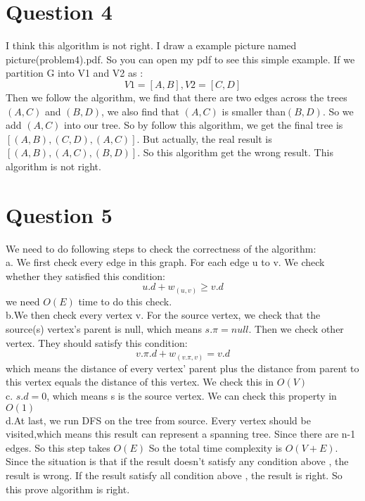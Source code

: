 \documentclass[paper=a4, fontsize=11pt]{scrartcl} %
\numberwithin{equation}{section} %
\numberwithin{figure}{section} %
\numberwithin{table}{section} %
\begin{document}
\vspace{2cm}
\section{\textbf{Question 4}}
I think this algorithm is not right. I draw a example picture named picture(problem4).pdf. So you can open my pdf to see this simple example. If we partition G into V1 and V2 as :
$$ V1=[A,B], V2=[C,D]$$
Then we follow the algorithm, we find that there are two edges across the trees$(A,C)$ and $(B,D)$, we also find that $(A,C)$ is smaller than$(B,D)$. So we add $(A,C)$ into our tree. So by follow this algorithm, we get the final tree is $[(A,B),(C,D),(A,C)]$. But actually, the real result is$[(A,B),(A,C),(B,D)]$. So this algorithm get the wrong result. This algorithm is not right.

\vspace{2cm}
\section{\textbf{Question 5}}
We need to do following steps to check the correctness of the algorithm:\\
a. We first check every edge in this graph. For each edge u to v. We check whether they satisfied this condition:
$$u.d+w_{(u,v)}\geq v.d$$ we need $O(E)$ time to do this check.\\
b.We then check every vertex v. For the source vertex, we check that the source(s) vertex's parent is null, which means $s.\pi=null$. Then we check other vertex. They should satisfy this condition: $$v.\pi.d+w_{(v.\pi,v)}=v.d$$ which means the distance of every vertex' parent plus the distance from parent to this vertex equals the distance of this vertex. We check this in $O(V)$\\
c. $s.d=0$, which means s is the source vertex. We can check this property in $O(1)$\\
d.At last, we run DFS on the tree from source. Every vertex should be visited,which means this result can represent a spanning tree. Since there are n-1 edges. So this step takes $O(E)$
So the total time complexity is $O(V+E)$. Since the situation is that if the result doesn't satisfy any condition above , the result is wrong. If the result satisfy all condition above , the result is right. So this prove algorithm is right. 
\end{document}
